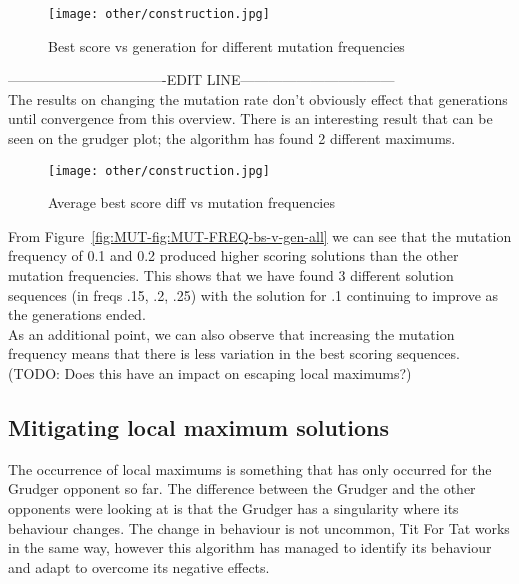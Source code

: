 \begin{figure}
    \texttt{[image: other/construction.jpg]}
    \caption{Best score vs generation for different mutation frequencies}\label{fig:MUT-FREQ-bs-v-gen-all}
\end{figure}
----------------------------------EDIT LINE---------------------------------\\

The results on changing the mutation rate don't obviously effect that generations until convergence from this overview. There is an interesting result that can be seen on the grudger plot; the algorithm has found 2 different maximums.   

\begin{figure}
    \texttt{[image: other/construction.jpg]}
    \caption{Average best score diff vs mutation frequencies}\label{fig:MUT-FREQ-bs-diff-v-freq-all}
\end{figure}

From Figure~\ref{fig:MUT-fig:MUT-FREQ-bs-v-gen-all} we can see that the mutation frequency of 0.1 and 0.2 produced higher scoring solutions than the other mutation frequencies. This shows that we have found 3 different solution sequences (in freqs .15, .2, .25) with the solution for .1 continuing to improve as the generations ended.\\
            
As an additional point, we can also observe that increasing the mutation frequency means that there is less variation in the best scoring sequences. (TODO: Does this have an impact on escaping local maximums?)

\subsection{Mitigating local maximum solutions}\label{sec:mitigating local maximums}
The occurrence of local maximums is something that has only occurred for the Grudger opponent so far. The difference between the Grudger and the other opponents were looking at is that the Grudger has a singularity where its behaviour changes. The change in behaviour is not uncommon, Tit For Tat works in the same way, however this algorithm has managed to identify its behaviour and adapt to overcome its negative effects.\\
            
